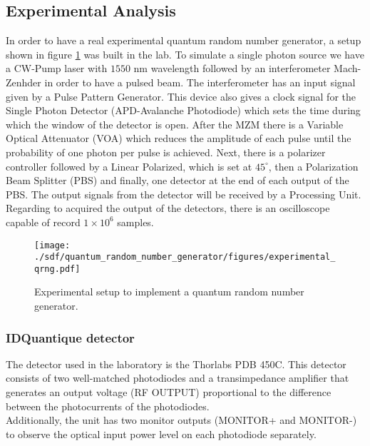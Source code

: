 \begin{refsection}
\begin{enumerate}
\end{enumerate}

\subsection{Experimental Analysis}

In order to have a real experimental quantum random number generator, a setup shown in figure \ref{experimental_qrng} was built in the lab. To simulate a single photon source we have a CW-Pump laser with $1550$ nm wavelength followed by an interferometer Mach-Zenhder in order to have a pulsed beam. The interferometer has an input signal given by a Pulse Pattern Generator. This device also gives a clock signal for the Single Photon Detector (APD-Avalanche Photodiode) which sets the time during which the window of the detector is open. After the MZM there is a Variable Optical Attenuator (VOA) which reduces the amplitude of each pulse until the probability of one photon per pulse is achieved. Next, there is a polarizer controller followed by a Linear Polarized, which is set at $45^{\circ}$, then a Polarization Beam Splitter (PBS) and finally, one detector at the end of each output of the PBS. The output signals from the detector will be received by a Processing Unit. Regarding to acquired the output of the detectors, there is an oscilloscope capable of record $1 \times 10^{6}$ samples.



\begin{figure}[H]
    \centering
        \texttt{[image: ./sdf/quantum\_random\_number\_generator/figures/experimental\_qrng.pdf]}
    \caption{Experimental setup to implement a quantum random number generator.}\label{experimental_qrng}
\end{figure}

\subsubsection{IDQuantique detector}
%
The detector used in the laboratory is the Thorlabs PDB 450C. This detector consists of two well-matched photodiodes and a transimpedance amplifier that generates an output voltage (RF OUTPUT) proportional to the difference between the photocurrents of the photodiodes.\\
Additionally, the unit has two monitor outputs (MONITOR+ and MONITOR-) to observe the optical input power level on each photodiode separately.


\end{refsection}
